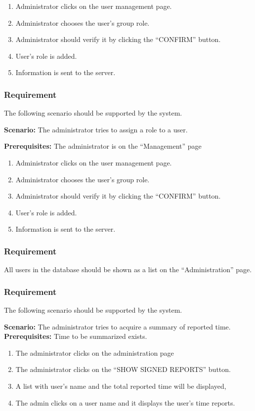 \documentclass{article}
\begin{document}
\begin{enumerate}
    \item Administrator clicks on the user management page.
    \item Administrator chooses the user’s group role.
    \item Administrator should verify it by clicking the “CONFIRM” button.
    \item User’s role is added.
    \item Information is sent to the server.
\end{enumerate}

\subsubsection{Requirement}
The following scenario should be supported by the system.

\textbf{Scenario:} The administrator tries to assign a role to a user.

\textbf{Prerequisites:} The administrator is on the “Management” page

\begin{enumerate}
    \item Administrator clicks on the user management page.
    \item Administrator chooses the user’s group role.
    \item Administrator should verify it by clicking the “CONFIRM” button.
    \item User’s role is added.
    \item Information is sent to the server.
\end{enumerate}

\subsubsection{Requirement}
All users in the database should be shown as a list on the “Administration” page.

\subsubsection{Requirement}
The following scenario should be supported by the system.

\textbf{Scenario:} The administrator tries to acquire a summary of reported time.
\textbf{Prerequisites:} Time to be summarized exists.

\begin{enumerate}
    \item The administrator clicks on the administration page 
    \item The administrator clicks on the “SHOW SIGNED REPORTS” button.
    \item A list with user’s name and the total reported time will be displayed,
    \item The admin clicks on a user name and it displays the user’s time reports.
\end{enumerate}
\end{document}
